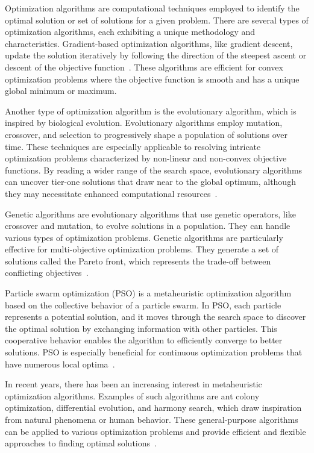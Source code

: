 Optimization algorithms are computational techniques employed to identify the optimal solution or set of solutions for a given problem. There are several types of optimization algorithms, each exhibiting a unique methodology and characteristics. Gradient-based optimization algorithms, like gradient descent, update the solution iteratively by following the direction of the steepest ascent or descent of the objective function~\cite{Ruder.2017}. These algorithms are efficient for convex optimization problems where the objective function is smooth and has a unique global minimum or maximum.

Another type of optimization algorithm is the evolutionary algorithm, which is inspired by biological evolution. Evolutionary algorithms employ mutation, crossover, and selection to progressively shape a population of solutions over time. These techniques are especially applicable to resolving intricate optimization problems characterized by non-linear and non-convex objective functions. By reading a wider range of the search space, evolutionary algorithms can uncover tier-one solutions that draw near to the global optimum, although they may necessitate enhanced computational resources~\cite{Back.1993}.

Genetic algorithms are evolutionary algorithms that use genetic operators, like crossover and mutation, to evolve solutions in a population. They can handle various types of optimization problems. Genetic algorithms are particularly effective for multi-objective optimization problems. They generate a set of solutions called the Pareto front, which represents the trade-off between conflicting objectives~\cite{Lambora.2019,Katoch.2021}.

Particle swarm optimization (\acrshort{PSO}) is a metaheuristic optimization algorithm based on the collective behavior of a particle swarm. In \acrshort{PSO}, each particle represents a potential solution, and it moves through the search space to discover the optimal solution by exchanging information with other particles. This cooperative behavior enables the algorithm to efficiently converge to better solutions. \acrshort{PSO} is especially beneficial for continuous optimization problems that have numerous local optima~\cite{Back.1993}.

In recent years, there has been an increasing interest in metaheuristic optimization algorithms. Examples of such algorithms are ant colony optimization, differential evolution, and harmony search, which draw inspiration from natural phenomena or human behavior. These general-purpose algorithms can be applied to various optimization problems and provide efficient and flexible approaches to finding optimal solutions~\cite{Yang.2011}.

